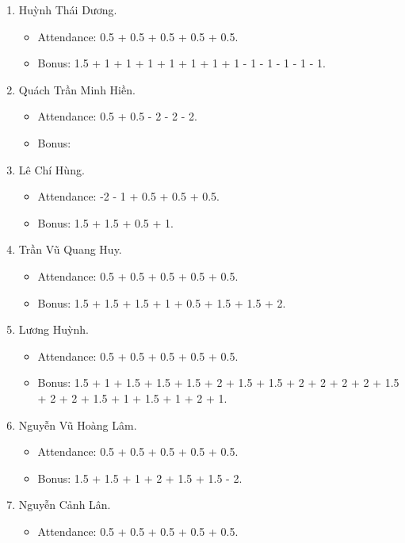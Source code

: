 \documentclass{article}
\begin{document}
\begin{enumerate}
\begin{itemize}
    \end{itemize}
    \item {\sc Huỳnh Thái Dương.}
    \begin{itemize}
        \item Attendance: 0.5 + 0.5 + 0.5 + 0.5 + 0.5.
        \item Bonus: 1.5 + 1 + 1 + 1 + 1 + 1 + 1 + 1 - 1 - 1 - 1 - 1 - 1.
    \end{itemize}
    \item {\sc Quách Trần Minh Hiền.}
    \begin{itemize}
        \item Attendance: 0.5 + 0.5 - 2 - 2 - 2.
        \item Bonus:
    \end{itemize}
    \item {\sc Lê Chí Hùng.}
    \begin{itemize}
        \item Attendance: -2 - 1 + 0.5 + 0.5 + 0.5.
        \item Bonus: 1.5 + 1.5 + 0.5 + 1.
    \end{itemize}
    \item {\sc Trần Vũ Quang Huy.}
    \begin{itemize}
        \item Attendance: 0.5 + 0.5 + 0.5 + 0.5 + 0.5.
        \item Bonus: 1.5 + 1.5 + 1.5 + 1 + 0.5 + 1.5 + 1.5 + 2.
    \end{itemize}
    \item {\sc Lương Huỳnh.}
    \begin{itemize}
        \item Attendance: 0.5 + 0.5 + 0.5 + 0.5 + 0.5.
        \item Bonus: 1.5 + 1 + 1.5 + 1.5 + 1.5 + 2 + 1.5 + 1.5 + 2 + 2 + 2 + 2 + 1.5 + 2 + 2 + 1.5 + 1 + 1.5 + 1 + 2 + 1.
    \end{itemize}
    \item {\sc Nguyễn Vũ Hoàng Lâm.}
    \begin{itemize}
        \item Attendance: 0.5 + 0.5 + 0.5 + 0.5 + 0.5.
        \item Bonus: 1.5 + 1.5 + 1 + 2 + 1.5 + 1.5 - 2.
    \end{itemize}
    \item {\sc Nguyễn Cảnh Lân.}
    \begin{itemize}
        \item Attendance: 0.5 + 0.5 + 0.5 + 0.5 + 0.5.

\end{itemize}
\end{enumerate}
\end{document}
